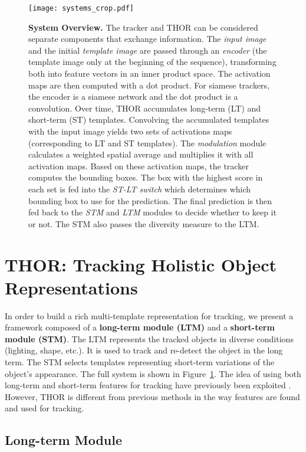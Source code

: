 \documentclass{article}
\begin{document}
\begin{figure}[htb!]
    \centering
    \texttt{[image: systems\_crop.pdf]}
    \caption{\textbf{System Overview.} The tracker and THOR can be considered separate components that exchange information.
    The \textit{input image} and the initial \textit{template image} are passed through an \textit{encoder} (the template image only at the beginning of the sequence), transforming both into feature vectors in an inner product space. The activation maps are then computed with a dot product. For siamese trackers, the encoder is a siamese network and the dot product is a convolution. Over time, THOR accumulates long-term (LT) and short-term (ST) templates. Convolving the accumulated templates with the input image yields two sets of activations maps (corresponding to LT and ST templates). The \textit{modulation} module calculates a weighted spatial average and multiplies it with all activation maps. Based on these activation maps, the tracker computes the bounding boxes. The box with the highest score in each set is fed into the \textit{ST-LT switch} which determines which bounding box to use for the prediction. The final prediction is then fed back to the \textit{STM} and \textit{LTM} modules to decide whether to keep it or not. The STM also passes the diversity measure  to the LTM.}
    \label{fig:system}
\end{figure}


\section{THOR: Tracking Holistic Object Representations} \label{sec:approach}

In order to build a rich multi-template representation for tracking, we present a framework composed of a \textbf{long-term module (LTM)} and a \textbf{short-term module (STM)}. The LTM represents the tracked objects in diverse conditions (lighting, shape, etc.). It is used to track and re-detect the object in the long term. The STM  selects templates representing short-term variations of the object's appearance. The full system is shown in Figure~\ref{fig:system}. The idea of using both long-term and short-term features for tracking have previously been exploited \cite{hong2015multi, lee2018memory}. However, THOR is different from previous methods in the way features are found and used for tracking.

\subsection{Long-term Module}\label{sec:longtermmodule}
\end{document}
